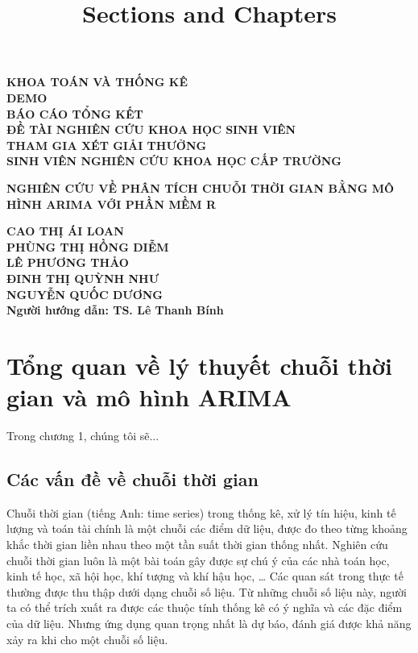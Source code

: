 \documentclass[12pt, a4paper,oneside]{book}
\title{Sections and Chapters}
\theoremstyle{definition}
\begin{document}
\begin{center}
	\textbf{{\normalsize KHOA TOÁN VÀ THỐNG KÊ}}\\
	\vspace{3cm}
	\textbf{{\LARGE DEMO}}\\
	\vspace{2.5cm}
	\textbf{{\normalsize BÁO CÁO TỔNG KẾT\\
			ĐỀ TÀI NGHIÊN CỨU KHOA HỌC SINH VIÊN\\
			THAM GIA XÉT GIẢI THƯỞNG\\
			SINH VIÊN NGHIÊN CỨU KHOA HỌC CẤP TRƯỜNG}}
		
		
		\vspace{2.5cm}
\textbf{{\large NGHIÊN CỨU VỀ PHÂN TÍCH CHUỖI THỜI GIAN BẰNG MÔ HÌNH ARIMA VỚI PHẦN MỀM R}}\\
\vspace{2.5cm}

           \textbf{	{\normalsize CAO THỊ ÁI LOAN\\
           		PHÙNG THỊ HỒNG DIỄM\\
           		LÊ PHƯƠNG THẢO\\
           		ĐINH THỊ QUỲNH NHƯ\\
           		NGUYỄN QUỐC DƯƠNG }}\\
           \vspace{1cm}
            \textbf{ Người hướng dẫn: TS. Lê Thanh Bính}
            
            
\end{center}
\tableofcontents

\chapter{Tổng quan về lý thuyết chuỗi thời gian và mô hình ARIMA}

Trong chương 1, chúng tôi sẽ...

\section{Các vấn đề về chuỗi thời gian}

Chuỗi thời gian (tiếng Anh: time series) trong thống kê, xử lý tín hiệu, kinh tế lượng và toán tài chính là một chuỗi các điểm dữ liệu, được đo theo từng khoảng khắc thời gian liền nhau theo một tần suất thời gian thống nhất. Nghiên cứu chuỗi thời gian luôn là một bài toán gây được sự chú ý của các nhà toán học, kinh tế học, xã hội học, khí tượng và khí hậu học, … Các quan sát trong thực tế thường được thu thập dưới dạng chuỗi số liệu. Từ những chuỗi số liệu này, người ta có thể trích xuất ra được các thuộc tính thống kê có ý nghĩa và các đặc điểm của dữ liệu. Nhưng ứng dụng quan trọng nhất là dự báo, đánh giá được khả năng xảy ra khi cho một chuỗi số liệu. 
\end{document}
